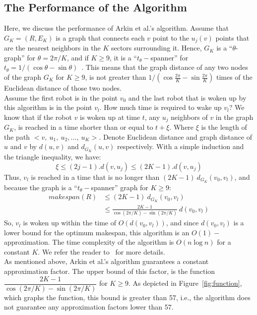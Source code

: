 \documentclass[review]{elsarticle}
\begin{document}
\subsection{The Performance of the Algorithm}
Here, we discuss the performance of Arkin et al.'s algorithm. Assume that $G_K=(R,E_K)$ is a graph that connects each $v$ point to the $u_j(v)$ points that are the nearest neighbors in the $K$ sectors surrounding it. Hence, $G_K$ is a ``$\theta$-graph'' for $\theta=2\pi/K$, and if $K\geq9$, it is a ``$t_\theta-$spanner'' for ${ t_\theta=1/(\cos\theta-\sin\theta) }$~\cite{Keil1992}.
This means that the graph distance of any two nodes of the graph $G_K$ for $K\geq9$, is not greater than ${ 1/(\cos\frac{2\pi}{K}-\sin\frac{2\pi}{K}) }$ times of the Euclidean distance of those two nodes. \\
Assume the first robot is in the point $v_0$ and the last robot that is woken up by this algorithm is in the point $v_l$. How much time is required to wake up $v_l$? We know that if the robot $v$ is woken up at time $t$, any $u_j$ neighbors of $v$ in the graph $G_K$, is reached in a time shorter than or equal to $t+\xi$. Where $\xi$ is the length of the path ${ <v,~u_1,~u_2,...,~u_K> }$. Denote Euclidean distance and graph distance of $u$ and $v$ by $d(u,v)$ and $d_{G_K}(u,v)$ respectively. With a simple induction and the triangle inequality, we have:
$$ \xi \leq (2j-1).d(v,u_j ) \leq (2K-1).d(v,u_j ) $$
Thus, $v_l$ is reached in a time that is no longer than $(2K-1)~d_{G_K}(v_0,v_l)$, and because the graph is a ``$t_\theta-$spanner'' graph for $K\geq9$:
\begin{align}
makespan(R)	&\leq (2K-1)~d_{G_K}(v_0,v_l) \nonumber \\
			&\leq \frac{2K-1}{\cos(2\pi/K)-\sin(2\pi/K)}~d(v_0,v_l) \nonumber
\end{align}
So, $v_l$ is woken up within the time of $O(d(v_0,v_l))$, and since $d(v_0,v_l)$ is a lower bound for the optimum makespan, this algorithm is an $O(1)-$approximation. The time complexity of the algorithm is $O(n\log n)$ for a constant $K$. We refer the reader to~\cite{Arkin2006} for more details.\\
As mentioned above, Arkin et al.'s algorithm guarantees a constant approximation factor. The upper bound of this factor, is the function $\dfrac{2K-1}{\cos(2\pi/K)-\sin(2\pi/K)}$ for $K\geq9$. As depicted in Figure~\ref{fig:function}, which graphs the function, this bound is greater than 57, i.e., the algorithm does not guarantee any approximation factors lower than 57.
\end{document}
